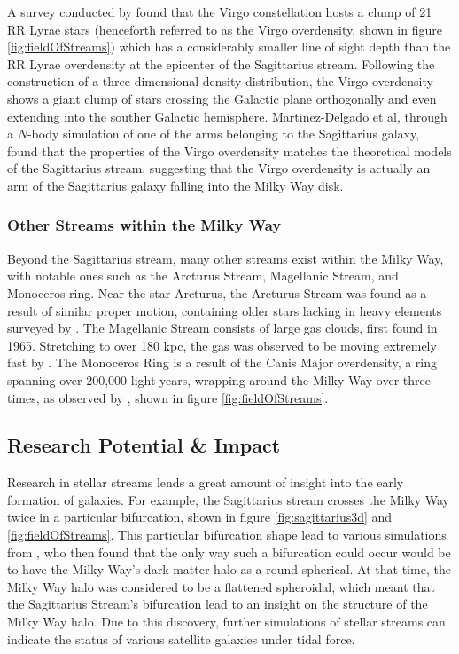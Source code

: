 \documentclass[twocolumn]{article}
\begin{document}
A survey conducted by \cite{virgoOverdensity} found that the Virgo constellation hosts a clump of 21 RR Lyrae stars (henceforth referred to as the Virgo overdensity, shown in figure \ref{fig:fieldOfStreams}) which has a considerably smaller line of sight depth than the RR Lyrae overdensity at the epicenter of the Sagittarius stream. Following the construction of a three-dimensional density distribution, the Virgo overdensity shows a giant clump of stars crossing the Galactic plane orthogonally and even extending into the souther Galactic hemisphere. Martinez-Delgado et al, through a $N$-body simulation of one of the arms belonging to the Sagittarius galaxy, found that the properties of the Virgo overdensity matches the theoretical models of the Sagittarius stream, suggesting that the Virgo overdensity is actually an arm of the Sagittarius galaxy falling into the Milky Way disk. 

\subsubsection{Other Streams within the Milky Way}
Beyond the Sagittarius stream, many other streams exist within the Milky Way, with notable ones such as the Arcturus Stream, Magellanic Stream, and Monoceros ring. Near the star Arcturus, the Arcturus Stream was found as a result of similar proper motion, containing older stars lacking in heavy elements surveyed by \cite{ghostOfSagittarius}. The Magellanic Stream consists of large gas clouds, first found in 1965. Stretching to over 180 kpc, the gas was observed to be moving extremely fast by \cite{magellanicStream}. The Monoceros Ring is a result of the Canis Major overdensity, a ring spanning over 200,000 light years, wrapping around the Milky Way over three times, as observed by \cite{monocerosRing}, shown in figure \ref{fig:fieldOfStreams}. 

\subsection{Research Potential \& Impact}
Research in stellar streams lends a great amount of insight into the early formation of galaxies. For example, the Sagittarius stream crosses the Milky Way twice in a particular bifurcation, shown in figure \ref{fig:sagittarius3d} and \ref{fig:fieldOfStreams}. This particular bifurcation shape lead to various simulations from \cite{sagittariusFork}, who then found that the only way such a bifurcation could occur would be to have the Milky Way's dark matter halo as a round spherical. At that time, the Milky Way halo was considered to be a flattened spheroidal, which meant that the Sagittarius Stream's bifurcation lead to an insight on the structure of the Milky Way halo. Due to this discovery, further simulations of stellar streams can indicate the status of various satellite galaxies under tidal force. 
\end{document}

